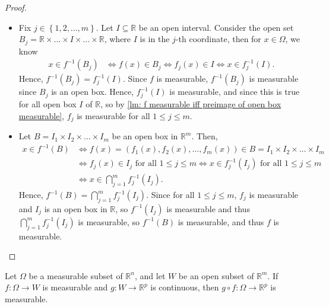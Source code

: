 \begin{proof}
    \hfill 
    \begin{itemize}
        \item [\((\implies)\)] Fix \(j \in \left\{ 1, 2, \dots , m \right\} \). Let \(I \subseteq \mathbb{R}\) be an open interval. Consider the open set \(B_j = \mathbb{R} \times \dots \times I \times \dots \times \mathbb{R} \), where \(I\) is in the \(j\)-th coordinate, then for \(x \in \Omega \), we know 
        \begin{align*}
            x \in f^{-1}(B_j) &\iff f(x) \in B_j \iff f_j(x) \in I \iff x \in f_j^{-1}(I).
        \end{align*}      
        Hence, \(f^{-1} (B_j) = f_j^{-1} (I)\). Since \(f\) is measurable, \(f^{-1}(B_j)\) is measurable since \(B_j\) is an open box. Hence, \(f_j^{-1}(I)\) is measurable, and since this is true for all open box \(I\) of \(\mathbb{R}\), so by \autoref{lm: f measurable iff preimage of open box measurable}, \(f_j\) is measurable for all \(1 \le j \le m\).       
        \item [\((\impliedby)\)] Let \(B = I_1 \times I_2 \times \dots \times I_m\) be an open box in \(\mathbb{R} ^m\). Then, 
        \begin{align*}
            x \in f^{-1}(B) &\iff f(x) = (f_1(x), f_2(x), \dots , f_m(x)) \in B = I_1 \times I_2 \times \dots \times I_m \\
            &\iff f_j(x) \in I_j \text{ for all } 1 \le j \le m \iff x \in f_j^{-1}(I_j) \text{ for all } 1 \le j \le m \\
            &\iff x \in \bigcap_{j=1}^{m} f_j^{-1}(I_j).   
        \end{align*}
        Hence, \(f^{-1}(B) = \bigcap_{j=1}^{m} f_j^{-1}(I_j)\). Since for all \(1 \le j \le m\), \(f_j\) is measurable and \(I_j\) is an open box in \(\mathbb{R} \), so \(f^{-1}(I_j)\) is measurable and thus \(\bigcap_{j=1}^{m} f_j^{-1}(I_j)\) is measurable, so \(f^{-1}(B)\) is measurable, and thus \(f\) is measurable.       
    \end{itemize}
\end{proof}

\begin{lemma} \label{lm: composition of conti and measurable func are measurable}
    Let \(\Omega \) be a measurable subset of \(\mathbb{R} ^n\), and let \(W\) be an open subset of \(\mathbb{R} ^m\). If \(f: \Omega \to W\) is measurable and \(g: W \to \mathbb{R} ^p\) is continuous, then \(g \circ f: \Omega \to \mathbb{R} ^p\) is measurable.      
\end{lemma}

